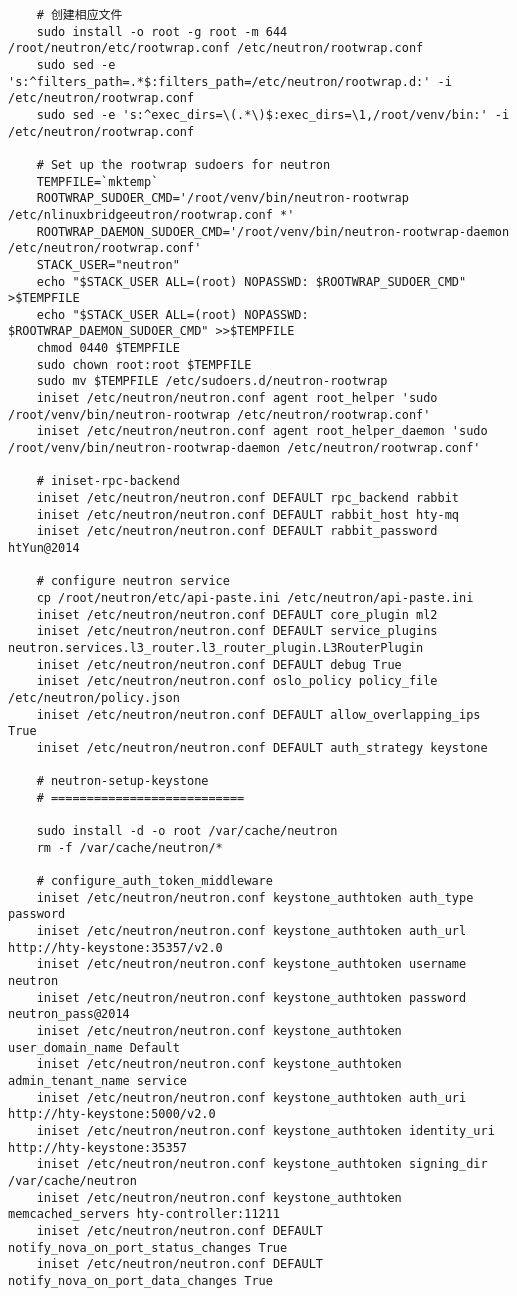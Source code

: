 \documentclass[a4paper,left=1.5cm,right=1.5cm,11pt]{article}
\begin{document}
\begin{lstlisting}
	# 创建相应文件
	sudo install -o root -g root -m 644 /root/neutron/etc/rootwrap.conf /etc/neutron/rootwrap.conf
	sudo sed -e 's:^filters_path=.*$:filters_path=/etc/neutron/rootwrap.d:' -i /etc/neutron/rootwrap.conf
	sudo sed -e 's:^exec_dirs=\(.*\)$:exec_dirs=\1,/root/venv/bin:' -i /etc/neutron/rootwrap.conf

	# Set up the rootwrap sudoers for neutron
	TEMPFILE=`mktemp`
	ROOTWRAP_SUDOER_CMD='/root/venv/bin/neutron-rootwrap /etc/nlinuxbridgeeutron/rootwrap.conf *'
	ROOTWRAP_DAEMON_SUDOER_CMD='/root/venv/bin/neutron-rootwrap-daemon /etc/neutron/rootwrap.conf'
	STACK_USER="neutron"
	echo "$STACK_USER ALL=(root) NOPASSWD: $ROOTWRAP_SUDOER_CMD" >$TEMPFILE
    echo "$STACK_USER ALL=(root) NOPASSWD: $ROOTWRAP_DAEMON_SUDOER_CMD" >>$TEMPFILE
    chmod 0440 $TEMPFILE
    sudo chown root:root $TEMPFILE
    sudo mv $TEMPFILE /etc/sudoers.d/neutron-rootwrap
	iniset /etc/neutron/neutron.conf agent root_helper 'sudo /root/venv/bin/neutron-rootwrap /etc/neutron/rootwrap.conf'
	iniset /etc/neutron/neutron.conf agent root_helper_daemon 'sudo /root/venv/bin/neutron-rootwrap-daemon /etc/neutron/rootwrap.conf'

	# iniset-rpc-backend
	iniset /etc/neutron/neutron.conf DEFAULT rpc_backend rabbit
	iniset /etc/neutron/neutron.conf DEFAULT rabbit_host hty-mq
	iniset /etc/neutron/neutron.conf DEFAULT rabbit_password htYun@2014

	# configure neutron service
	cp /root/neutron/etc/api-paste.ini /etc/neutron/api-paste.ini
	iniset /etc/neutron/neutron.conf DEFAULT core_plugin ml2
	iniset /etc/neutron/neutron.conf DEFAULT service_plugins neutron.services.l3_router.l3_router_plugin.L3RouterPlugin
	iniset /etc/neutron/neutron.conf DEFAULT debug True
	iniset /etc/neutron/neutron.conf oslo_policy policy_file /etc/neutron/policy.json
	iniset /etc/neutron/neutron.conf DEFAULT allow_overlapping_ips True
	iniset /etc/neutron/neutron.conf DEFAULT auth_strategy keystone

	# neutron-setup-keystone
	# ===========================

	sudo install -d -o root /var/cache/neutron
	rm -f /var/cache/neutron/*

	# configure_auth_token_middleware
	iniset /etc/neutron/neutron.conf keystone_authtoken auth_type password
	iniset /etc/neutron/neutron.conf keystone_authtoken auth_url http://hty-keystone:35357/v2.0
	iniset /etc/neutron/neutron.conf keystone_authtoken username neutron
	iniset /etc/neutron/neutron.conf keystone_authtoken password neutron_pass@2014
	iniset /etc/neutron/neutron.conf keystone_authtoken user_domain_name Default
	iniset /etc/neutron/neutron.conf keystone_authtoken admin_tenant_name service
	iniset /etc/neutron/neutron.conf keystone_authtoken auth_uri http://hty-keystone:5000/v2.0
	iniset /etc/neutron/neutron.conf keystone_authtoken identity_uri http://hty-keystone:35357
	iniset /etc/neutron/neutron.conf keystone_authtoken signing_dir /var/cache/neutron
	iniset /etc/neutron/neutron.conf keystone_authtoken memcached_servers hty-controller:11211
	iniset /etc/neutron/neutron.conf DEFAULT notify_nova_on_port_status_changes True
	iniset /etc/neutron/neutron.conf DEFAULT notify_nova_on_port_data_changes True


\end{lstlisting}
\end{document}
